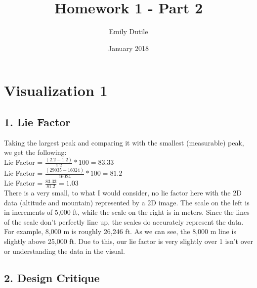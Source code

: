 \documentclass{neu_handout}
\title{Homework 1 - Part 2}
\author{Emily Dutile}
\date{January 2018}
\begin{document}
\section*{Visualization 1}

\subsection*{1. Lie Factor}

Taking the largest peak and comparing it with the smallest (measurable) peak, we get the following:\\

Lie Factor = $ \frac{(2.2 - 1.2)}{1.2} * 100 = 83.33 $
\\

Lie Factor = $ \frac{(29035 - 16024)}{16024} * 100 = 81.2 $
\\

Lie Factor = $ \frac{83.33}{81.2} = 1.03 $
\\

There is a very small, to what I would consider, no lie factor here with the 2D data (altitude and mountain) represented by a 2D image. The scale on the left is in increments of 5,000 ft, while the scale on the right is in meters. Since the lines of the scale don't perfectly line up, the scales do accurately represent the data. For example, 8,000 m is roughly 26,246 ft. As we can see, the 8,000 m line is slightly above 25,000 ft. Due to this, our lie factor is  very slightly over 1 isn't over or understanding the data in the visual.


\subsection*{2. Design Critique}
\end{document}
